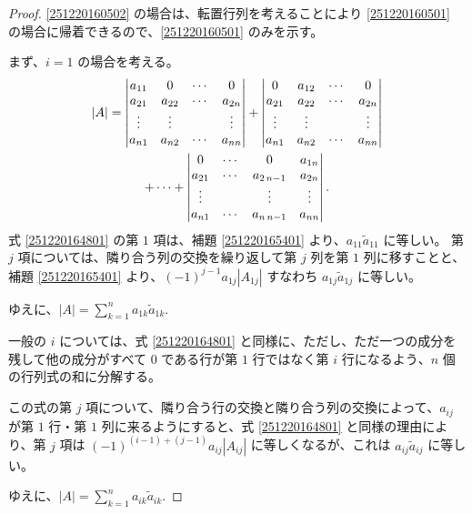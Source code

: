 \begin{proof}
  \ref{251220160502} の場合は、転置行列を考えることにより \ref{251220160501} の場合に帰着できるので、\ref{251220160501} のみを示す。

  まず、\(i=1\) の場合を考える。
  \begin{gather}
    |A|=
      \begin{vmatrix}
        a_{11} & 0      & \cdots & 0      \\
        a_{21} & a_{22} & \cdots & a_{2n} \\
        \vdots & \vdots &        & \vdots \\
        a_{n1} & a_{n2} & \cdots & a_{nn}
      \end{vmatrix}
                  +
      \begin{vmatrix}
        0      & a_{12} & \cdots & 0      \\
        a_{21} & a_{22} & \cdots & a_{2n} \\
        \vdots & \vdots &        & \vdots \\
        a_{n1} & a_{n2} & \cdots & a_{nn}
      \end{vmatrix} \notag \\
        +\cdots+
      \begin{vmatrix}
        0          & \cdots     & 0          & a_{1n} \\
        a_{21}     & \cdots     & a_{2\,n-1} & a_{2n} \\
        \vdots     &            & \vdots     & \vdots \\
        a_{n1}     & \cdots     & a_{n\,n-1} & a_{nn}
      \end{vmatrix}. \label{251220164801}
  \end{gather}
  式 \eqref{251220164801} の第 \(1\) 項は、補題 \ref{251220165401} より、\(a_{11}\tilde{a}_{11}\) に等しい。
  第 \(j\) 項については、隣り合う列の交換を繰り返して第 \(j\) 列を第 \(1\) 列に移すことと、補題 \eqref{251220165401} より、\((-1)^{j-1}a_{1j}|A_{1j}|\) すなわち \(a_{1j}\tilde{a}_{1j}\) に等しい。

  ゆえに、\(\displaystyle |A|=\sum_{k=1}^n a_{1k}\tilde{a}_{1k}.\)

  一般の \(i\) については、式 \eqref{251220164801} と同様に、ただし、ただ一つの成分を残して他の成分がすべて \(0\) である行が第 \(1\) 行ではなく第 \(i\) 行になるよう、\(n\) 個の行列式の和に分解する。

  この式の第 \(j\) 項について、隣り合う行の交換と隣り合う列の交換によって、\(a_{ij}\) が第 \(1\) 行・第 \(1\) 列に来るようにすると、式 \eqref{251220164801} と同様の理由により、第 \(j\) 項は \((-1)^{(i-1)+(j-1)}a_{ij}|A_{ij}|\) に等しくなるが、これは \(a_{ij}\tilde{a}_{ij}\) に等しい。

  ゆえに、\(\displaystyle |A|=\sum_{k=1}^n a_{ik}\tilde{a}_{ik}.\)
\end{proof}

